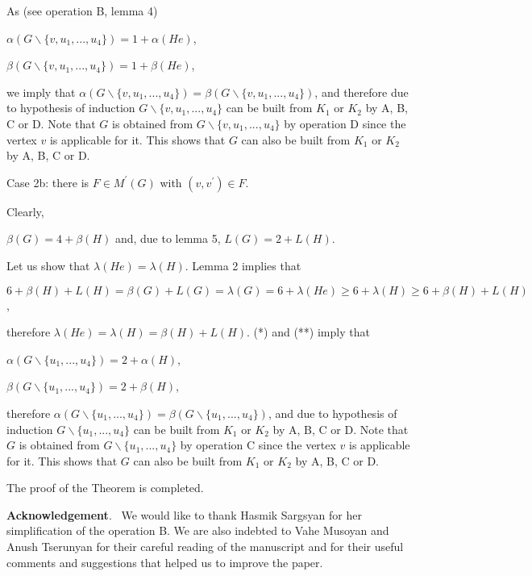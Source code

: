 \documentclass{article}
\begin{document}
As (see operation B, lemma 4)

\begin{center}
$\alpha (G\backslash \{v,u_{1},...,u_{4}\})=1+\alpha (He)$,

$\beta (G\backslash \{v,u_{1},...,u_{4}\})=1+\beta (He)$,
\end{center}

we imply that $\alpha (G\backslash \{v,u_{1},...,u_{4}\})=\beta (G\backslash
\{v,u_{1},...,u_{4}\})$, and therefore due to hypothesis of induction $G\backslash \{v,u_{1},...,u_{4}\}$ can be built from $K_{1}$ or $K_{2}$ by
A, B, C or D. Note that $G$ is obtained from $G\backslash
\{v,u_{1},...,u_{4}\}$ by operation D since the vertex $v$ is applicable for
it. This shows that $G$ can also be built from $K_{1}$ or $K_{2}$ by A, B, C
or D.

Case 2b: there is $F\in M^{\prime }(G)$ with $(v,v^{\prime })\in F$.

Clearly,

\begin{center}
$\beta (G)=4+\beta (H)$ and, due to lemma 5, $L(G)=2+L(H)$.
\end{center}

Let us show that $\lambda (He)=\lambda (H)$. Lemma 2 implies that

\begin{center}
$6+\beta (H)+L(H)=\beta (G)+L(G)=\lambda (G)=6+\lambda (He)\geq 6+\lambda
(H)\geq 6+\beta (H)+L(H)$,
\end{center}

therefore $\lambda (He)=\lambda (H)=\beta (H)+L(H)$. (*) and (**) imply that

\begin{center}
$\alpha (G\backslash \{u_{1},...,u_{4}\})=2+\alpha (H)$,

$\beta (G\backslash \{u_{1},...,u_{4}\})=2+\beta (H)$,
\end{center}

therefore $\alpha (G\backslash \{u_{1},...,u_{4}\})=\beta (G\backslash
\{u_{1},...,u_{4}\})$, and due to hypothesis of induction $G\backslash
\{u_{1},...,u_{4}\}$ can be built from $K_{1}$ or $K_{2}$ by A, B, C or D.
Note that $G$ is obtained from $G\backslash \{u_{1},...,u_{4}\}$ by
operation C since the vertex $v$ is applicable for it. This shows that $G$
can also be built from $K_{1}$ or $K_{2}$ by A, B, C or D.

The proof of the Theorem is completed.

\bigskip

\textbf{Acknowledgement}. \ We would like to thank Hasmik Sargsyan for her
simplification of the operation B. We are also indebted to Vahe Musoyan and
Anush Tserunyan for their careful reading of the manuscript and for their
useful comments and suggestions that helped us to improve the paper.
\end{document}
